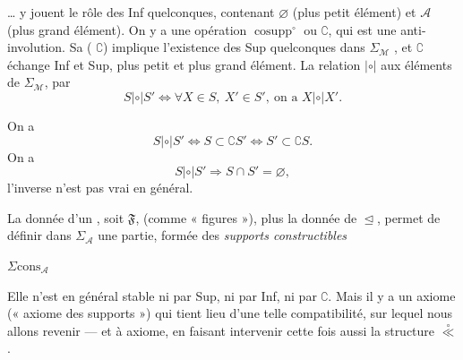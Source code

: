 \documentclass[11pt,a4paper]{article}
\begin{document}

… y jouent  le rôle des Inf quelconques, contenant
$\varnothing$ (plus petit élément) et $\mathcal{A}$ (plus grand élément). On y
a une opération $\operatorname{cosupp}^{\circ}$ ou $\complement$, qui est une anti-involution. Sa \ill{}  (
$\complement$) implique l'existence des Sup quelconques dans
$\Sigma_{\mathcal{M}}$ , et $\complement$ échange Inf et
Sup, plus petit et plus grand élément. La relation $\mathrel{|\circ|}$
  aux éléments de
$\Sigma_{\mathcal{M}}$, par
\[
  S \mathrel{|\circ|} S' \iff \forall X \in S,\ X' \in S',\ \text{on a }
  X \mathrel{|\circ|} X' .
\]

On a
\[
  S \mathrel{|\circ|} S' \iff S \subset \complement S' \iff S' \subset \complement S .
\]
On a
\[
  S \mathrel{|\circ|} S' \Longrightarrow S \cap S' = \varnothing ,
\]
l'inverse n'est pas vrai en général.


La donnée d'un , soit $\mathfrak{F}$, (comme
« figures »),  plus la donnée de $\trianglelefteq$, permet de
définir dans $\Sigma_{\mathcal{A}}$ une partie, formée des \emph{supports
constructibles}



\textbf{$\Sigma\mathrm{cons}_{\mathcal{A}}$}

Elle n'est \struck{\ill{}} en général stable ni par Sup, ni par Inf, ni par
$\complement$. Mais il y a un axiome (« axiome des supports ») qui tient lieu
d'une telle compatibilité, sur lequel nous allons  revenir --- et à   axiome, en faisant intervenir cette fois aussi la structure $\overset{\circ}{\ll}$.
\end{document}
